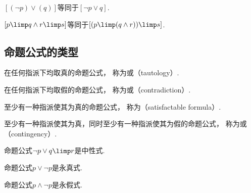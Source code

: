 
\begin{example}
\([(\neg p) \lor (q)]\)等同于\([\neg p \lor q]\).
\end{example}

\begin{example}
\([p \limp q \land r \limp s]\)等同于\([(p \limp (q \land r)) \limp s]\).
\end{example}

\subsection{命题公式的类型}
\begin{definition}
在任何指派下均取真的命题公式，
称为或（tautology）.
\end{definition}

\begin{definition}
在任何指派下均取假的命题公式，
称为或（contradiction）.
\end{definition}

\begin{definition}
至少有一种指派使其为真的命题公式，
称为（satisfactable formula）.
\end{definition}

\begin{definition}
至少有一种指派使其为真，同时至少有一种指派使其为假的命题公式，
称为或（contingency）.
\end{definition}

\begin{example}
命题公式\(\neg p \lor q \limp r\)是中性式.
\end{example}

\begin{example}
命题公式\(p \lor \neg p\)是永真式.
\end{example}

\begin{example}
命题公式\(p \land \neg p\)是永假式.
\end{example}


